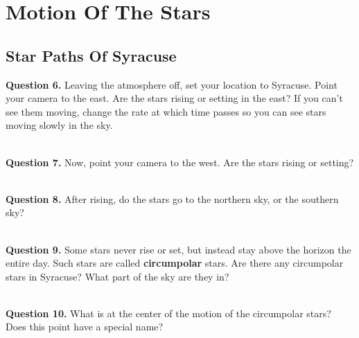 \documentclass[11pt]{article}
\begin{document}
	
	
	
	\section{Motion Of The Stars}
	
	\subsection{Star Paths Of Syracuse}
	
	\textbf{Question 6.} Leaving the atmosphere off, set your location to Syracuse. Point your camera to the east. Are the stars rising or setting in the east? If you can't see them moving, change the rate at which time passes so you can see stars moving slowly in
	the sky.\\
	\vspace*{1.5cm}
	
	\hrulefill\\
	
	
	\textbf{Question 7.} Now, point your camera to the west. Are the stars rising or setting?\\
	\vspace*{1.5cm}
	
	\hrulefill\\   
	
	\textbf{Question 8.} After rising, do the stars go to the northern sky, or the southern sky?\\
	\vspace*{1.5cm}
	
	\hrulefill\\
	
	\textbf{Question 9.} Some stars never rise or set, but instead stay above the horizon the entire day. Such stars are called \textbf{circumpolar} stars. Are there any circumpolar stars in Syracuse? What part of the sky are they in?\\
	\vspace*{1.5cm}
	
	\hrulefill\\
	\newpage
	\textbf{Question 10.} What is at the center of the motion of the circumpolar stars? Does this point have a special name?\\
	\vspace*{1.5cm}
	
\end{document}

